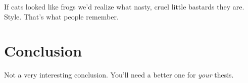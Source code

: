 \begin{savequote}[45mm]
If cats looked like frogs we'd realize what nasty, cruel little bastards they are. Style. That's what people remember.
\end{savequote}

\chapter{Conclusion}

Not a very interesting conclusion. You'll need a better one for \emph{your} thesis.
